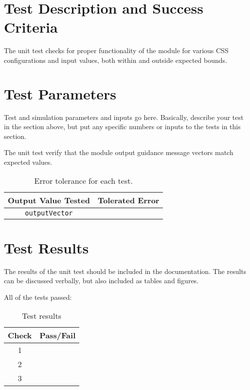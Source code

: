 
\section{Test Description and Success Criteria}
The unit test checks for proper functionality of the module for various CSS configurations and input values, both within and outside expected bounds.



\section{Test Parameters}

Test and simulation parameters and inputs go here. Basically, describe your test in the section above, but put any specific numbers or inputs to the tests in this section.

The unit test verify that the module output guidance message vectors match expected values.
\begin{table}[htbp]
	\caption{Error tolerance for each test.}
	\label{tab:errortol}
	\centering \fontsize{10}{10}\selectfont
	\begin{tabular}{ c | c } %
		\hline\hline
		\textbf{Output Value Tested}  & \textbf{Tolerated Error}  \\ 
		\hline
		{\tt outputVector}        & 	   \\ 
		\hline\hline
	\end{tabular}
\end{table}




\section{Test Results}
The results of the unit test should be included in the documentation.  The results can be discussed verbally, but also included as tables and figures.  

All of the tests passed:
\begin{table}[H]
	\caption{Test results}
	\label{tab:results}
	\centering \fontsize{10}{10}\selectfont
	\begin{tabular}{c | c  } %
		\hline\hline
		\textbf{Check} 						  		&\textbf{Pass/Fail} \\ 
		\hline
	   1	   			&  \\ 
	   2	   			&  \\ 
	   3	   			&  \\ 
	   \hline\hline
	\end{tabular}
\end{table}



